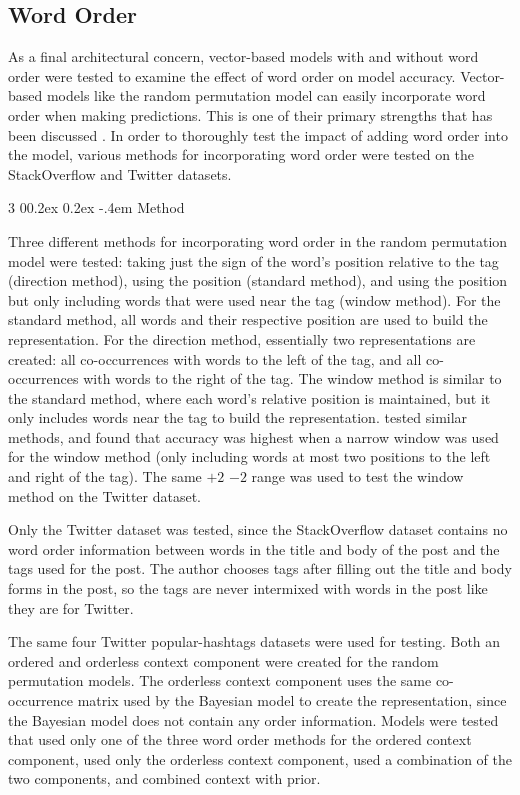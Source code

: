 \documentclass[man,donotrepeattitle]{apa6}
\makeatletter
\renewcommand{\subsubsection}{%
  \@startsection
  {subsubsection}%
  {3}%
  {\parindent}%
  {0\baselineskip \@plus 0.2ex \@minus 0.2ex}%
  {-.4em}%
  {\normalfont\normalsize\bfseries\addperi}}
\makeatother
\begin{document}
\subsection{Word Order}

As a final architectural concern, vector-based models with and without word order were tested to examine the effect of word order on model accuracy.
Vector-based models like the random permutation model can easily incorporate word order when making predictions.
This is one of their primary strengths that has been discussed \parencites{Jones2007, Sahlgren2008}.
In order to thoroughly test the impact of adding word order into the model, various methods for incorporating word order were tested on the StackOverflow and Twitter datasets.

\subsubsection{Method}

Three different methods for incorporating word order in the random permutation model were tested:
taking just the sign of the word's position relative to the tag (direction method), using the position (standard method), and using the position but only including words that were used near the tag (window method).
For the standard method, all words and their respective position are used to build the representation.
For the direction method, essentially two representations are created: all co-occurrences with words to the left of the tag, and all co-occurrences with words to the right of the tag.
The window method is similar to the standard method, where each word's relative position is maintained, but it only includes words near the tag to build the representation.
\textcite{Sahlgren2008} tested similar methods, and found that accuracy was highest when a narrow window was used for the window method (only including words at most two positions to the left and right of the tag).
The same $+2$ $-2$ range was used to test the window method on the Twitter dataset.

Only the Twitter dataset was tested, since the StackOverflow dataset contains no word order information between words in the title and body of the post and the tags used for the post.
The author chooses tags after filling out the title and body forms in the post, so the tags are never intermixed with words in the post like they are for Twitter.

The same four Twitter popular-hashtags datasets were used for testing.
Both an ordered and orderless context component were created for the random permutation models.
The orderless context component uses the same co-occurrence matrix used by the Bayesian model to create the representation, since the Bayesian model does not contain any order information.
Models were tested that used only one of the three word order methods for the ordered context component, used only the orderless context component, used a combination of the two components, and combined context with prior. 
\end{document}
